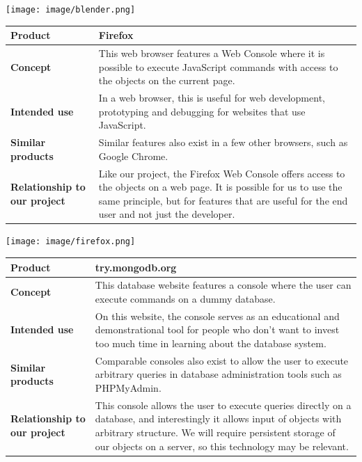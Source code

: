 \begin{center}
\texttt{[image: image/blender.png]}
\label{blendercimage}%
\end{center}

\begin{center}
\begin{tabularx}{\textwidth}{ l X }
\hline
\textbf{Product} & Firefox \\ \hline
\textbf{Concept} & This web browser features a Web Console where it is possible to execute JavaScript commands with access to the objects on the current page. \\ \hline
\textbf{Intended use} & In a web browser, this is useful for web development, prototyping and debugging for websites that use JavaScript. \\ \hline
\textbf{Similar products} & Similar features also exist in a few other browsers, such as Google Chrome. \\ \hline
\textbf{Relationship to our project} & Like our project, the Firefox Web Console offers access to the objects on a web page. It is possible for us to use the same principle, but for features that are useful for the end user and not just the developer. \\ \hline
\end{tabularx}
\label{tab:firefoxc}
\end{center}

\begin{center}
\texttt{[image: image/firefox.png]}
\label{firefoxcimage}%
\end{center}


\begin{center}
\begin{tabularx}{\textwidth}{ l X }
\hline
\textbf{Product} & try.mongodb.org \\ \hline
\textbf{Concept} & This database website features a console where the user can execute commands on a dummy database. \\ \hline
\textbf{Intended use} & On this website, the console serves as an educational and demonstrational tool for people who don't want to invest too much time in learning about the database system. \\ \hline
\textbf{Similar products} & Comparable consoles also exist to allow the user to execute arbitrary queries in database administration tools such as PHPMyAdmin. \\ \hline
\textbf{Relationship to our project} & This console allows the user to execute queries directly on a database, and interestingly it allows input of objects with arbitrary structure. We will require persistent storage of our objects on a server, so this technology may be relevant. \\ \hline
\end{tabularx}
\label{tab:mongodbc}
\end{center}

